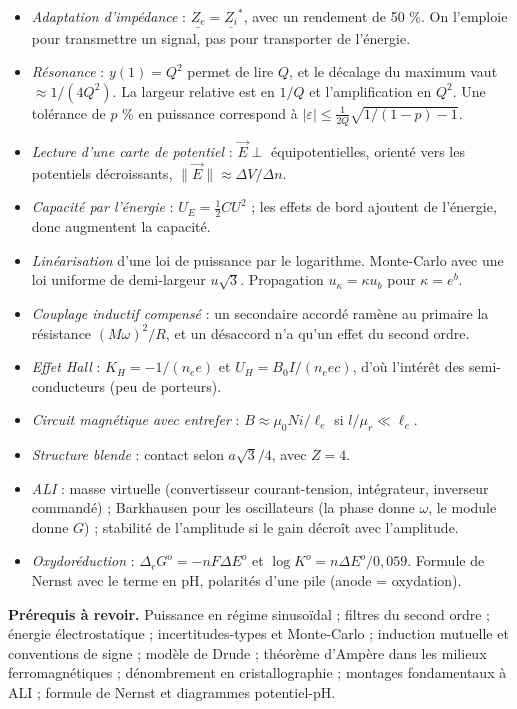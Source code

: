\documentclass[11pt,a4paper]{article}
\providecommand{\tightlist}{\setlength{\itemsep}{0pt}\setlength{\parskip}{0pt}}
\begin{document}
\begin{itemize}
\tightlist
\item
  \emph{Adaptation d'impédance} : \(\underline{Z_e}=\underline{Z_i}^*\), avec un rendement de 50 \%. On l'emploie pour transmettre un signal, pas pour transporter de l'énergie.
\item
  \emph{Résonance} : \(y(1)=Q^2\) permet de lire \(Q\), et le décalage du maximum vaut \(\approx1/(4Q^2)\). La largeur relative est en \(1/Q\) et l'amplification en \(Q^2\).
  Une tolérance de \(p\) \% en puissance correspond à \(|\varepsilon|\leqslant\frac{1}{2Q}\sqrt{1/(1-p)-1}\).
\item
  \emph{Lecture d'une carte de potentiel} : \(\vec E\perp\) équipotentielles, orienté vers les potentiels décroissants, \(\|\vec E\|\approx\Delta V/\Delta n\).
\item
  \emph{Capacité par l'énergie} : \(U_E=\frac12CU^2\) ; les effets de bord ajoutent de l'énergie, donc augmentent la capacité.
\item
  \emph{Linéarisation} d'une loi de puissance par le logarithme. Monte-Carlo avec une loi uniforme de demi-largeur \(u\sqrt3\). Propagation \(u_\kappa=\kappa u_b\) pour \(\kappa=e^b\).
\item
  \emph{Couplage inductif compensé} : un secondaire accordé ramène au primaire la résistance \((M\omega)^2/R\), et un désaccord n'a qu'un effet du second ordre.
\item
  \emph{Effet Hall} : \(K_H=-1/(n_ee)\) et \(U_H=B_0I/(n_eec)\), d'où l'intérêt des semi-conducteurs (peu de porteurs).
\item
  \emph{Circuit magnétique avec entrefer} : \(B\approx\mu_0Ni/\ell_e\) si \(l/\mu_r\ll\ell_e\).
\item
  \emph{Structure blende} : contact selon \(a\sqrt3/4\), avec \(Z=4\).
\item
  \emph{ALI} : masse virtuelle (convertisseur courant-tension, intégrateur, inverseur commandé) ; Barkhausen pour les oscillateurs (la phase donne \(\omega\), le module donne \(G\)) ; stabilité de l'amplitude si le gain décroît avec l'amplitude.
\item
  \emph{Oxydoréduction} : \(\Delta_rG^o=-nF\Delta E^o\) et \(\log K^o=n\Delta E^o/0{,}059\). Formule de Nernst avec le terme en pH, polarités d'une pile (anode = oxydation).
\end{itemize}

\textbf{Prérequis à revoir.} Puissance en régime sinusoïdal ; filtres du second ordre ; énergie électrostatique ; incertitudes-types et Monte-Carlo ; induction mutuelle et conventions de signe ; modèle de Drude ; théorème d'Ampère dans les milieux ferromagnétiques ; dénombrement en cristallographie ; montages fondamentaux à ALI ; formule de Nernst et diagrammes potentiel-pH.
\end{document}

